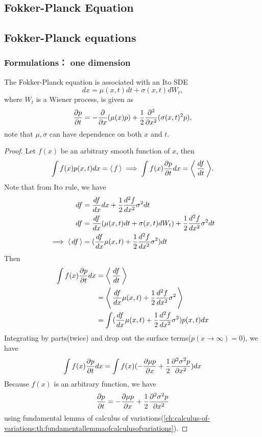 \begin{refsection}
	\startcontents[chapters]


\chapter{Fokker-Planck Equation}\label{ch:fokker-planck-equation}	
\section{Fokker-Planck equations}

\subsection{Formulations： one dimension}
\begin{lemma}\cite[121]{chirikjian2011stochastic1}\cite[79]{clark2011foreign}\label{ch:theory-of-stochastic-process:th:oneDFokkerPlanckEquation}\label{ch:theory-of-stochastic-process:th:1DFokkerPlanckEquationAssociatedWithItoSDE}
	The Fokker-Planck equation is associated with an Ito SDE
	$$dx = \mu(x,t) dt + \sigma(x,t) dW_t,$$
	where $W_t$ is a Wiener process, is given as
	$$\frac{\partial p}{\partial t} = -\frac{\partial}{\partial x}(\mu(x)p)  + \frac{1}{2}\frac{\partial^2}{\partial x^2}(\sigma(x,t)^2p),$$
	note that $\mu,\sigma$ can have dependence on both $x$ and $t$.
\end{lemma}
\begin{proof}
	Let $f(x)$ be an arbitrary smooth function of $x$, then
	$$\int f(x)p(x,t) dx = {\left< \, f \, \right>} \implies \int f(x)\frac{\partial p}{\partial t} dx = {\left< \, \frac{d f}{d t} \, \right>}.$$
	Note that from Ito rule, we have
	\begin{align*}
	df &= \frac{df}{dx} dx + \frac{1}{2}\frac{d^2f}{dx^2} \sigma^2 dt \\
	df &= \frac{df}{dx} (\mu(x,t) dt + \sigma(x,t) dW_t) + \frac{1}{2}\frac{d^2f}{dx^2} \sigma^2 dt \\
	\implies {\left< \, df \, \right>} &= (\frac{df}{dx} \mu(x,t)  + \frac{1}{2}\frac{d^2f}{dx^2} \sigma^2 )dt
	\end{align*}
	Then
	\begin{align*}
	\int f(x)\frac{\partial p}{\partial t} dx &= {\left< \, \frac{d f}{d t} \, \right>} \\&= {\left< \, \frac{df}{dx} \mu(x,t)  + \frac{1}{2}\frac{d^2f}{dx^2} \sigma^2 \, \right>}\\
	&=\int (\frac{df}{dx} \mu(x,t)  + \frac{1}{2}\frac{d^2f}{dx^2} \sigma^2) p(x,t)dx
	\end{align*}
	Integrating by parts(twice) and drop out the surface terms($p(x\to\infty) = 0$), we have
	$$\int f(x)\frac{\partial p}{\partial t} dx = \int f(x)(-\frac{\partial \mu p}{\partial x} + \frac{1}{2}\frac{\partial^2 \sigma^2 p}{\partial x^2})dx$$
	Because $f(x)$ is an arbitrary function, we have
	$$\frac{\partial p}{\partial t} = -\frac{\partial \mu p}{\partial x} + \frac{1}{2}\frac{\partial^2 \sigma^2 p}{\partial x^2}$$
	using fundamental lemma of calculus of variations(\autoref{ch:calculus-of-variations:th:fundamentallemmaofcalculusofvariations}).
\end{proof}


\end{refsection}
